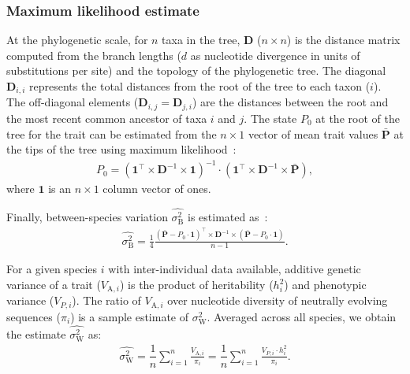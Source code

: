 \documentclass{article}
\newcommand{\Multiply}{\cdot}
\newcommand{\MultiplyMatrix}{\times}
\newcommand{\UniDimArray}[1]{\bm{#1}}
\newcommand{\BiDimArray}[1]{\bm{#1}}
\newcommand{\tr}{^{\intercal}}
\newcommand{\inv}{^{-1}}
\newcommand{\Spi}{i}
\newcommand{\Spj}{j}
\newcommand{\NbrTaxa}{n}
\newcommand{\Trait}{P}
\newcommand{\Heritability}{h^2}
\newcommand{\VecTrait}{\UniDimArray{\bar{\Trait}}}
\newcommand{\Root}{0}
\newcommand{\RootTrait}{\Trait_{\Root}}
\newcommand{\VecOne}{\UniDimArray{1}}
\newcommand{\Distance}{\BiDimArray{D}}
\newcommand{\DistanceMatrix}{\BiDimArray{\Distance}}
\newcommand{\VarGeneticSpi}{V_{\mathrm{A}, \Spi}}
\newcommand{\RateBetween}{\sigma^2_{\mathrm{B}}}
\newcommand{\RateWhithin}{\sigma^2_{\mathrm{W}}}
\newcommand{\EstRateBetween}{\widehat{\RateBetween}}
\newcommand{\EstRateWhithin}{\widehat{\RateWhithin}}
\begin{document}
\subsubsection{Maximum likelihood estimate}
At the phylogenetic scale, for $\NbrTaxa$ taxa in the tree, $\DistanceMatrix$ ($\NbrTaxa \times \NbrTaxa$) is the distance matrix computed from the branch lengths ($d$ as nucleotide divergence in units of substitutions per site) and the topology of the phylogenetic tree.
The diagonal $\Distance_{\Spi,\Spi}$ represents the total distances from the root of the tree to each taxon ($\Spi$).
The off-diagonal elements ($\Distance_{\Spi,\Spj} = \Distance_{\Spj,\Spi}$) are the distances between the root and the most recent common ancestor of taxa $\Spi$ and $\Spj$.
The state $\RootTrait$ at the root of the tree for the trait can be estimated from the $\NbrTaxa \times 1$ vector of mean trait values $\VecTrait$ at the tips of the tree using maximum likelihood~\parencite{omeara_testing_2006}:
\begin{gather}
    \RootTrait = \left( \VecOne\tr \MultiplyMatrix \DistanceMatrix\inv \MultiplyMatrix \VecOne \right)\inv \Multiply \left( \VecOne\tr \MultiplyMatrix \DistanceMatrix\inv \MultiplyMatrix \VecTrait \right), \label{eq:estimated-root-trait}
\end{gather}
where $\VecOne$ is an $\NbrTaxa \times 1$ column vector of ones.

Finally, between-species variation $\EstRateBetween$ is estimated as~\parencite{omeara_testing_2006}:
\begin{gather}
    \EstRateBetween = \frac{1}{4}\frac{\left( \VecTrait -  \RootTrait \Multiply \VecOne \right)\tr \MultiplyMatrix \DistanceMatrix\inv \MultiplyMatrix \left( \VecTrait -  \RootTrait \Multiply \VecOne  \right)}{\NbrTaxa - 1}. \label{eq:estimated-rate-phy}
\end{gather}

For a given species $\Spi$ with inter-individual data available, additive genetic variance of a trait ($\VarGeneticSpi$) is the product of heritability ($\Heritability_{i}$) and phenotypic variance ($V_{\Trait, i}$).
The ratio of $\VarGeneticSpi$ over nucleotide diversity of neutrally evolving sequences ($\pi_{\Spi}$) is a sample estimate of $\RateWhithin$.
Averaged across all species, we obtain the estimate $\EstRateWhithin$ as:
\begin{gather}
    \EstRateWhithin = \dfrac{1}{\NbrTaxa}\sum_{i=1}^{\NbrTaxa}\frac{  \VarGeneticSpi}{ \pi_{i}} = \dfrac{1}{\NbrTaxa}\sum_{i=1}^{\NbrTaxa} \frac{  V_{\Trait, i} \Multiply \Heritability_{i}}{ \pi_{i}}. \label{eq:estimated-rate-pop}
\end{gather}
\end{document}
